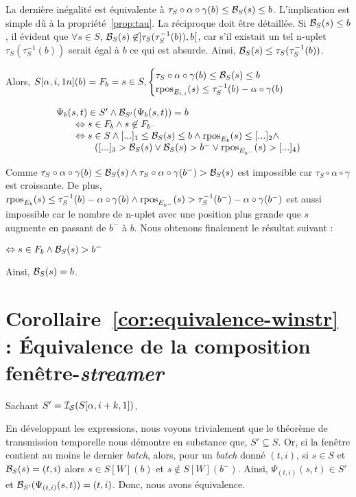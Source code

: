 La dernière inégalité est équivalente à $\tau_S\circ\alpha\circ\gamma(b) \leq \mathcal{B}_S(s) \leq  b$. L'implication est simple dû à la propriété~\ref{prop:tau}. La réciproque doit être détaillée. Si $\mathcal{B}_S(s) \leq b$, il évident que $\forall s\in S$, $\mathcal{B}_S(s)\not\in]\tau_S(\tau_S^{-1}(b)), b[$, car s'il existait un tel n-uplet $\tau_S(\tau_S^{-1}(b))$ serait égal à $b$ ce qui est absurde. Ainsi, $\mathcal{B}_S(s) \leq \tau_S(\tau_S^{-1}(b))$.

Alors, $S[\alpha,i,1n](b) = F_{b}=s\in S, \begin{cases}\tau_S\circ\alpha\circ\gamma(b) \leq \mathcal{B}_S(s) \leq b \\\mathop{\mathrm{rpos}}_{E_{t,i}}(s) \leq \tau_S^{-1}(b) - \alpha\circ\gamma(b) \end{cases}$

$$\begin{array}{l}\Psi_{b}(s,t)\in S' \wedge \mathcal{B}_{S'}(\Psi_{b}(s,t)) = b\\ \qquad
 \Leftrightarrow  s\in F_{b} \wedge s\not\in F_{b^-} \\ \qquad
 \Leftrightarrow  s\in S \wedge [...]_1 \leq \mathcal{B}_S(s) \leq b \wedge \mathop{\mathrm{rpos}}_{E_{b}}(s) \leq [...]_2\wedge \\ \qquad
 \qquad  ([...]_3 > \mathcal{B}_S(s) \vee \mathcal{B}_S(s) > b^- \vee \mathop{\mathrm{rpos}}_{E_{b^-}}(s) > [...]_4)\end{array}$$

Comme $\tau_S\circ\alpha\circ\gamma(b) \leq \mathcal{B}_S(s) \wedge \tau_S\circ\alpha\circ\gamma(b^-) > \mathcal{B}_S(s)$ est impossible car $\tau_S\circ\alpha\circ\gamma$ est croissante. De plus, $\mathop{\mathrm{rpos}}_{E_{b}}(s) \leq \tau_S^{-1}(b) - \alpha\circ\gamma(b) \wedge \mathop{\mathrm{rpos}}_{E_{b^-}}(s) > \tau_S^{-1}(b^-) - \alpha\circ\gamma(b^-)$ est aussi impossible car le nombre de n-uplet avec une position plus grande que $s$ augmente en passant de $b^-$ à $b$. Nous obtenons finalement le résultat suivant :

$\Leftrightarrow s\in F_{b} \wedge \mathcal{B}_S(s) > b^-$

Ainsi, $\mathcal{B}_S(s) = b$.
\findemo

\section{Corollaire~\ref{cor:equivalence-winstr} : Équivalence de la composition fenêtre-\textit{streamer}}
Sachant $S' = \mathcal{I_S}(S[\alpha,i+k,1])$,

En développant les expressions, nous voyons trivialement que le théorème de transmission temporelle nous démontre en substance que, $S' \subseteq S$. Or, si la fenêtre contient au moins le dernier \textit{batch}, alors, pour un \textit{batch} donné $(t,i)$, si $s\in S$ et $\mathcal{B}_S(s)=(t,i)$ alors $s\in S[W](b)$ et $s\not\in S[W](b^-)$. Ainsi, $\Psi_{(t,i)}(s,t) \in S'$ et $\mathcal{B}_{S'}(\Psi_{(t,i)}(s,t)) = (t,i)$. Donc, nous avons équivalence.

